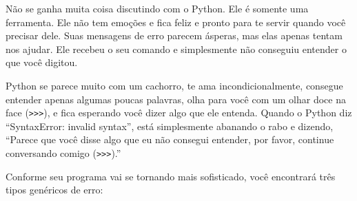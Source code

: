 
Não se ganha muita coisa discutindo com o Python. Ele é somente uma ferramenta.
Ele não tem emoções e fica feliz e pronto para te servir quando você
precisar dele. Suas mensagens de erro parecem ásperas, mas elas apenas tentam nos
ajudar. Ele recebeu o seu comando e simplesmente não conseguiu entender
o que você digitou.
%

Python se parece muito com um cachorro, te ama incondicionalmente, consegue
entender apenas algumas poucas palavras, olha para você com um olhar doce na
face ({\tt >>>}), e fica esperando você dizer algo que ele entenda.
Quando o Python diz ``SyntaxError: invalid syntax'', está simplesmente
abanando o rabo e dizendo, ``Parece que você disse algo que eu não consegui
entender, por favor, continue conversando comigo ({\tt >>>}).''
%

Conforme seu programa vai se tornando mais sofisticado, você encontrará três
tipos genéricos de erro:
%

